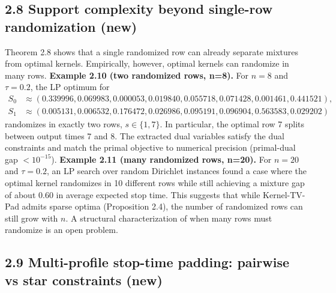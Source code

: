 \documentclass[11pt]{article}
\begin{document}
\hypertarget{support-complexity-beyond-single-row-randomization-new}{%
\subsection{2.8 Support complexity beyond single-row randomization
(new)}\label{support-complexity-beyond-single-row-randomization-new}}

Theorem 2.8 shows that a single randomized row can already separate
mixtures from optimal kernels. Empirically, however, optimal kernels can
randomize in many rows. \textbf{Example 2.10 (two randomized rows,
n=8).} For \(n=8\) and \(\tau=0.2\), the LP optimum for \[
\begin{aligned}
S_0 &\approx (0.339996,0.069983,0.000053,0.019840,0.055718,0.071428,0.001461,0.441521),\\
S_1 &\approx (0.005131,0.006532,0.176472,0.026986,0.095191,0.096904,0.563583,0.029202)
\end{aligned}
\] randomizes in exactly two rows, \(s\in\{1,7\}\). In particular, the
optimal row 7 splits between output times 7 and 8. The extracted dual
variables satisfy the dual constraints and match the primal objective to
numerical precision (primal-dual gap \(<10^{-15}\)). \textbf{Example
2.11 (many randomized rows, n=20).} For \(n=20\) and \(\tau=0.2\), an LP
search over random Dirichlet instances found a case where the optimal
kernel randomizes in 10 different rows while still achieving a mixture
gap of about 0.60 in average expected stop time. This suggests that
while Kernel-TV-Pad admits sparse optima (Proposition 2.4), the number
of randomized rows can still grow with \(n\). A structural
characterization of when many rows must randomize is an open problem.

\hypertarget{multi-profile-stop-time-padding-pairwise-vs-star-constraints-new}{%
\subsection{2.9 Multi-profile stop-time padding: pairwise vs star
constraints
(new)}\label{multi-profile-stop-time-padding-pairwise-vs-star-constraints-new}}
\end{document}
